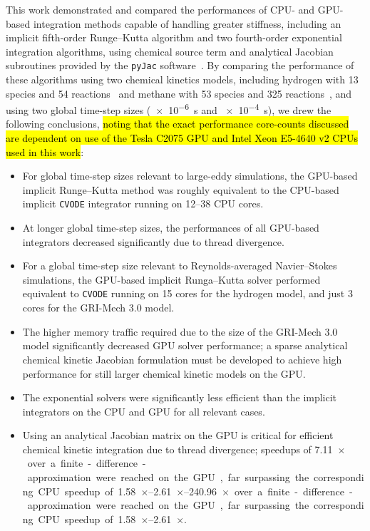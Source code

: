 \documentclass[preprint,review,11pt]{elsarticle}
\DeclareRobustCommand{\hly}[1]{\sethlcolor{yellow}\hl{#1}}
\begin{document}
This work demonstrated and compared the performances of CPU- and GPU-based integration methods capable of handling greater stiffness, including an implicit fifth-order Runge--Kutta algorithm and two fourth-order exponential integration algorithms, using chemical source term and analytical Jacobian subroutines provided by the \texttt{pyJac} software~\cite{niemeyer_2016_51139,Niemeyer:2015ws,Niemeyer:2016aa}.
By comparing the performance of these algorithms using two chemical kinetics models, including hydrogen with 13 species and 54 reactions~\cite{Burke:2011fh} and methane with 53 species and 325 reactions~\cite{smith_gri-mech_30}, and using two global time-step sizes (\SI{e-6}{\second} and \SI{e-4}{\second}), we drew the following conclusions, \hly{noting that the exact performance core-counts discussed are dependent on use of the Tesla C2075 GPU and Intel Xeon E5-4640 v2 CPUs used in this work}:
\begin{itemize}
 \item For global time-step sizes relevant to large-eddy simulations, the GPU-based implicit Runge--Kutta method was roughly equivalent to the CPU-based implicit \texttt{CVODE} integrator running on \numrange{12}{38} CPU cores.
 \item At longer global time-step sizes, the performances of all GPU-based integrators decreased significantly due to thread divergence.
 \item For a global time-step size relevant to Reynolds-averaged Navier--Stokes simulations, the GPU-based implicit Runga--Kutta solver performed equivalent to \texttt{CVODE} running on \num{15} cores for the hydrogen model, and just \num{3} cores for the GRI-Mech 3.0 model.
 \item The higher memory traffic required due to the size of the GRI-Mech 3.0 model significantly decreased GPU solver performance; a sparse analytical chemical kinetic Jacobian formulation must be developed to achieve high performance for still larger chemical kinetic models on the GPU.
 \item The exponential solvers were significantly less efficient than the implicit integrators on the CPU and GPU for all relevant cases.
 \item Using an analytical Jacobian matrix on the GPU is critical for efficient chemical kinetic integration due to thread divergence; speedups of \SIrange{7.11}{240.96}{$\times$} over a finite-difference-approximation were reached on the GPU, far surpassing the corresponding CPU speedup of \SIrange{1.58}{2.61}{$\times$}.
\end{itemize}
\end{document}
